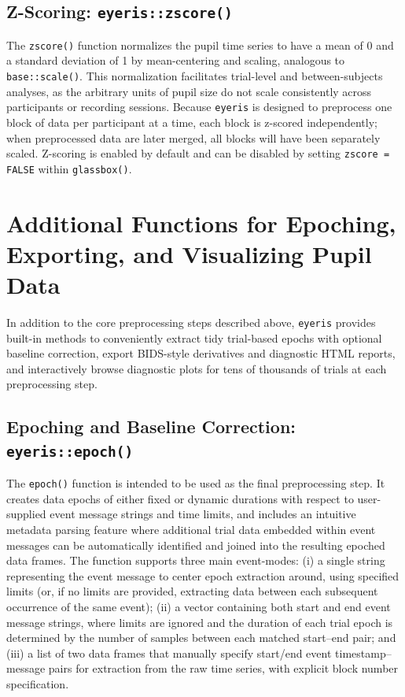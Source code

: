 \subsection{Z-Scoring: \texttt{eyeris::zscore()}}
The \texttt{zscore()} function normalizes the pupil time series to have a mean of 0 and a standard deviation of 1 by mean-centering and scaling, analogous to \texttt{base::scale()}. This normalization facilitates trial-level and between-subjects analyses, as the arbitrary units of pupil size do not scale consistently across participants or recording sessions. Because \texttt{eyeris} is designed to preprocess one block of data per participant at a time, each block is z-scored independently; when preprocessed data are later merged, all blocks will have been separately scaled. Z-scoring is enabled by default and can be disabled by setting \texttt{zscore = FALSE} within \texttt{glassbox()}.

\section{Additional Functions for Epoching, Exporting, and Visualizing Pupil Data}
In addition to the core preprocessing steps described above, \texttt{eyeris} provides built-in methods to conveniently extract tidy trial-based epochs with optional baseline correction, export BIDS-style derivatives and diagnostic HTML reports, and interactively browse diagnostic plots for tens of thousands of trials at each preprocessing step.

\subsection{Epoching and Baseline Correction: \texttt{eyeris::epoch()}}
The \texttt{epoch()} function is intended to be used as the final preprocessing step. It creates data epochs of either fixed or dynamic durations with respect to user-supplied event message strings and time limits, and includes an intuitive metadata parsing feature where additional trial data embedded within event messages can be automatically identified and joined into the resulting epoched data frames. The function supports three main event-modes: (i) a single string representing the event message to center epoch extraction around, using specified limits (or, if no limits are provided, extracting data between each subsequent occurrence of the same event); (ii) a vector containing both start and end event message strings, where limits are ignored and the duration of each trial epoch is determined by the number of samples between each matched start–end pair; and (iii) a list of two data frames that manually specify start/end event timestamp–message pairs for extraction from the raw time series, with explicit block number specification.

